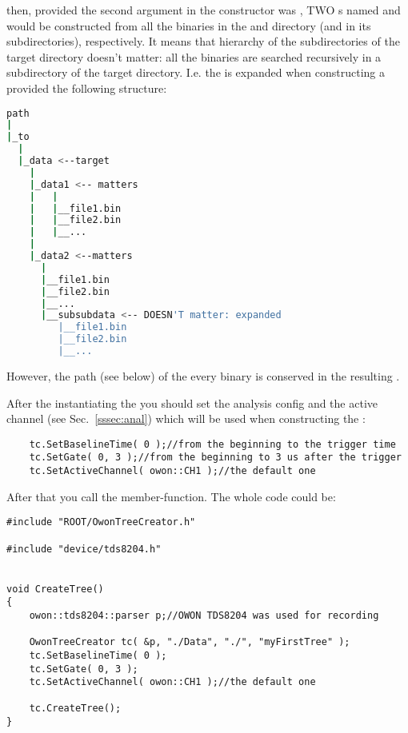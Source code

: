then, provided the second argument in the  constructor
was , TWO s named  and
 would be constructed from all the binaries in the  and
 directory (and in its subdirectories), respectively.
It means that hierarchy of the subdirectories of the target directory doesn't matter:
all the binaries are searched recursively in a subdirectory of the target directory. I.e.
the  is expanded when constructing a  provided the following
structure:
\begin{lstlisting}[language=bash]
path
|
|_to
  |
  |_data <--target
    |
    |_data1 <-- matters
    |   | 
    |   |__file1.bin
    |   |__file2.bin
    |   |__...
    |
    |_data2 <--matters
      |
      |__file1.bin
      |__file2.bin
      |__...
      |__subsubdata <-- DOESN'T matter: expanded
         |__file1.bin
         |__file2.bin
         |__...
\end{lstlisting}
However, the path (see below) of the every binary is conserved in the resulting
.

After the instantiating the  you should set the analysis config and
the active channel
(see Sec.~\ref{sssec:anal}) which will be used when constructing the :
\begin{lstlisting}
    tc.SetBaselineTime( 0 );//from the beginning to the trigger time
    tc.SetGate( 0, 3 );//from the beginning to 3 us after the trigger
    tc.SetActiveChannel( owon::CH1 );//the default one
\end{lstlisting}


After that you call the  member-function. The whole code could be:

\begin{lstlisting}
#include "ROOT/OwonTreeCreator.h"

#include "device/tds8204.h"


void CreateTree()
{
    owon::tds8204::parser p;//OWON TDS8204 was used for recording

    OwonTreeCreator tc( &p, "./Data", "./", "myFirstTree" );
    tc.SetBaselineTime( 0 );
    tc.SetGate( 0, 3 );
    tc.SetActiveChannel( owon::CH1 );//the default one

    tc.CreateTree();
}
\end{lstlisting}

